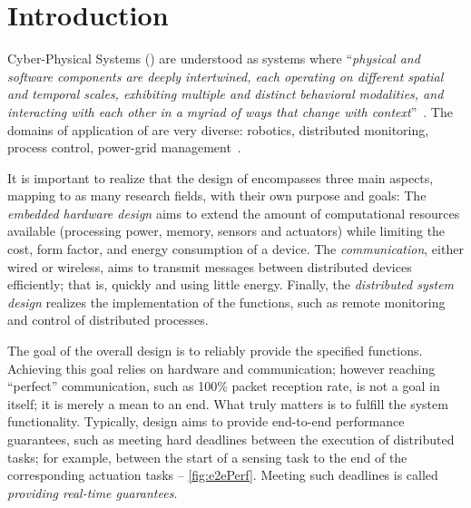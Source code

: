 
\chapter{Introduction}
\label{ch:introduction}

Cyber-Physical Systems (\CPS) are understood as systems where ``\emph{physical and software components are deeply intertwined, each operating on different spatial and temporal scales, exhibiting multiple and distinct behavioral modalities, and interacting with each other in a myriad of ways that change with context}''~\cite{nsf2010Cyber}.
The domains of application of \CPS are very diverse: \eg robotics, distributed monitoring, process control, power-grid management~\cite{stankovic2008WSAN, lee2008Cyber, rajkumar2010CPS}.

It is important to realize that the design of \CPS encompasses three main aspects, mapping to as many research fields, with their own purpose and goals: %
	The \emph{embedded hardware design} aims to extend the amount of computational resources available (\eg processing power, memory, sensors and actuators) while limiting the cost, form factor, and energy consumption of a device.
	The \emph{communication}, either wired or wireless, aims to transmit messages between distributed devices efficiently; that is, quickly and using little energy.
	Finally, the \emph{distributed system design} realizes the implementation of the \CPS functions, such as \eg remote monitoring and control of distributed processes.

The goal of the overall design is to reliably provide the specified \CPS functions.
Achieving this goal relies on hardware and communication; however reaching ``perfect'' communication, such as 100\% packet reception rate, is not a goal in itself; it is merely a mean to an end. What truly matters is to fulfill the system functionality.
Typically, \CPS design aims to provide end-to-end performance guarantees, such as meeting hard deadlines between the execution of distributed tasks; for example, between the start of a sensing task to the end of the corresponding actuation tasks -- \cref{fig:e2ePerf}.
Meeting such deadlines is called \emph{providing real-time guarantees}.

